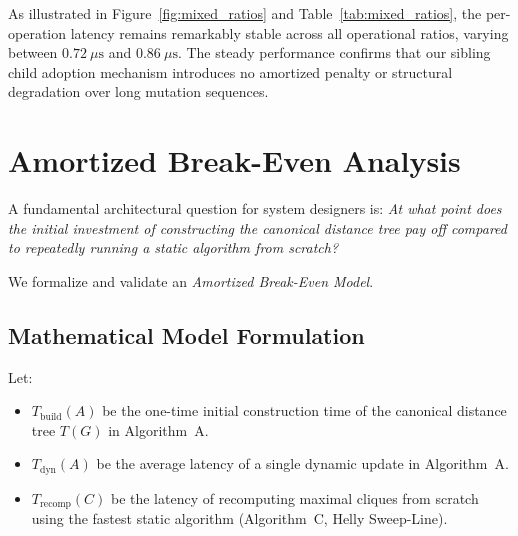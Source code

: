 \begin{table}[htbp]
\centering
\small
\caption[Comparative Benchmarks across Characteristic Graph Families]{Performance across Characteristic Graph Families ($n = 1,000$): Edge counts, clique counts, static execution times, and dynamic update latencies.}
\label{tab:graph_families}
\end{table}

As illustrated in Figure~\ref{fig:mixed_ratios} and Table~\ref{tab:mixed_ratios}, the per-operation latency remains remarkably stable across all operational ratios, varying between $0.72\ \mu\text{s}$ and $0.86\ \mu\text{s}$. The steady performance confirms that our sibling child adoption mechanism introduces no amortized penalty or structural degradation over long mutation sequences.

\section{Amortized Break-Even Analysis}
\label{sec:exp_breakeven}

A fundamental architectural question for system designers is: \emph{At what point does the initial investment of constructing the canonical distance tree pay off compared to repeatedly running a static algorithm from scratch?}

We formalize and validate an \emph{Amortized Break-Even Model}.

\subsection{Mathematical Model Formulation}
Let:
\begin{itemize}
    \item $T_{\text{build}}(A)$ be the one-time initial construction time of the canonical distance tree $T(G)$ in Algorithm~A.
    \item $T_{\text{dyn}}(A)$ be the average latency of a single dynamic update in Algorithm~A.
    \item $T_{\text{recomp}}(C)$ be the latency of recomputing maximal cliques from scratch using the fastest static algorithm (Algorithm~C, Helly Sweep-Line).
\end{itemize}

